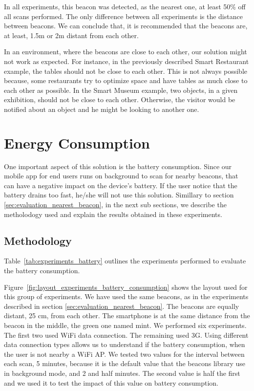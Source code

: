 In all experiments, this beacon was detected, as the nearest one, at least 50\% off all scans performed.
The only difference between all experiments is the distance between beacons.
We can conclude that, it is recommended that the beacons are, at least, 1.5m or 2m distant from each other.

In an environment, where the beacons are close to each other, our solution might not work as expected.
For instance, in the previously described Smart Restaurant example,
the tables should not be close to each other. This is not always possible because, some restaurants try to optimize space and have tables as much close to each other as possible.
In the Smart Museum example, two objects, in a given exhibition, should not be close to each other.
Otherwise, the visitor would be notified about an object and he might be looking to another one.

\section{Energy Consumption}
\label{sec:evaluation_energy_onsumption}
One important aspect of this solution is the battery consumption.
Since our mobile app for end users runs on background to scan for nearby beacons, that can have a negative impact on the device's battery. If the user notice that the battery drains too fast, he/she will not use this solution.
Simillary to section \ref{sec:evaluation_nearest_beacon}, in the next sub sections, we describe the metholodogy used and explain the results obtained in these experiments.

\subsection{Methodology}
\label{sub:evaluation_energy_consumption_methodology}
Table~\ref{tab:experiments_battery} outlines the experiments performed to evaluate the battery consumption.



Figure~\ref{fig:layout_experiments_battery_consumption} shows the layout used for this group of experiments.
We have used the same beacons, as in the experiments described in section \ref{sec:evaluation_nearest_beacon}.
The beacons are equally distant, 25 cm, from each other.
The smartphone is at the same distance from the beacon in the middle, the green one named mint.
We performed six experiments. The first two used \gls{WiFi} data connection. The remaining used \gls{3G}.
Using different data connection types allows us to understand if the battery consumption, when the user is not nearby a \gls{WiFi} \gls{AP}.
We tested two values for the interval between each scan, 5 minutes, because it is the default value that the beacons library use in background mode, and 2 and half minutes.
The second value is half the first and we used it to test the impact of this value on battery consumption.

